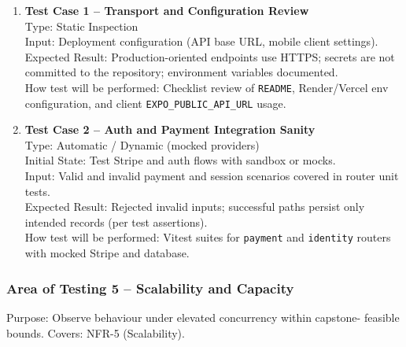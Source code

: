 \documentclass[12pt, titlepage]{article}
\begin{document}
\begin{enumerate}
\item \textbf{Test Case 1 – Transport and Configuration Review}\\
Type: Static Inspection\\
Input: Deployment configuration (API base URL, mobile client settings).\\
Expected Result: Production-oriented endpoints use HTTPS; secrets are not committed to the repository; environment variables documented.\\
How test will be performed: Checklist review of \texttt{README}, Render/Vercel env configuration, and client \texttt{EXPO\_PUBLIC\_API\_URL} usage.\\[5pt]

\item \textbf{Test Case 2 – Auth and Payment Integration Sanity}\\
Type: Automatic / Dynamic (mocked providers)\\
Initial State: Test Stripe and auth flows with sandbox or mocks.\\
Input: Valid and invalid payment and session scenarios covered in router unit tests.\\
Expected Result: Rejected invalid inputs; successful paths persist only intended records (per test assertions).\\
How test will be performed: Vitest suites for \texttt{payment} and \texttt{identity} routers with mocked Stripe and database.\\
\end{enumerate}

\subsubsection{Area of Testing 5 – Scalability and Capacity}

Purpose: Observe behaviour under elevated concurrency within capstone- feasible bounds.  
Covers: NFR-5 (Scalability).
\end{document}
